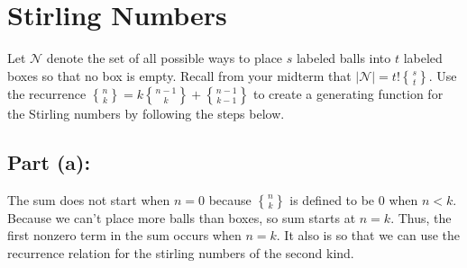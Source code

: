 \documentclass[answers]{exam}
\newcommand{\stirling}[2]{\genfrac{\{}{\}}{0pt}{}{#1}{#2}}
\begin{document}
		\section{Stirling Numbers}
	\begin{questions}
		
		\question  	Let $\mathcal{N}$ denote the set of all possible ways to place $s$ labeled balls into $t$ labeled boxes so that no box is empty. Recall from your midterm that $|\mathcal{N}| = t!\stirling{s}{t}$. Use the recurrence $\stirling{n}{k} = k \stirling{n-1}{k} + \stirling{n-1}{k-1}$ to create a generating function for the Stirling numbers by following the steps below.
		

		\begin{solution}
			\subsection*{Part (a):}
			The sum does not start when $n=0$ because $\stirling{n}{k}$ is defined to be $0$ when $n < k$. Because we can't place more balls than boxes, so sum starts at $n=k$. Thus, the first nonzero term in the sum occurs when $n=k$. It also is so that we can use the recurrence relation for the stirling numbers of the second kind.


\end{solution}
\end{questions}
\end{document}
